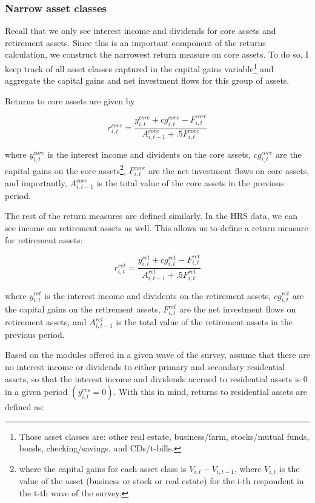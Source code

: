  \subsubsection{Narrow asset classes}
 
\par Recall that we only see interest income and dividends for core assets and retirement assets. Since this is an important component of the returns calculation, we construct the narrowest return measure on core assets. To do so, I keep track of all asset classes captured in the capital gains variable\footnote{Those asset classes are: other real estate, business/farm, stocks/mutual funds, bonds, checking/savings, and CDs/t-bills.} and aggregate the capital gains and net investment flows for this group of assets.

\par Returns to core assets are given by

$$ r^{core}_{i,t} = \frac{y^{core}_{i,t} + cg^{core}_{i,t} - F^{core}_{i,t}}{A^{core}_{i,t-1} + .5F^{core}_{i,t}}   $$

where $y^{core}_{i,t}$ is the interest income and dividents on the core assets, $cg^{core}_{i,t}$ are the capital gains on the core assets\footnote{where the capital gains for each asset class is $V_{i,t} - V_{i,t-1}$, where $V_{i,t}$ is the value of the asset (business or stock or real estate) for the i-th respondent in the t-th wave of the survey.}, $F^{core}_{i,t}$ are the net investment flows on core assets, and importantly, $A^{core}_{i,t-1}$ is the total value of the core assets in the previous period.

\par The rest of the return measures are defined similarly. In the HRS data, we can see income on retirement assets as well. This allows us to define a return measure for retirement assets:

$$ r^{ret}_{i,t} = \frac{y^{ret}_{i,t} + cg^{ret}_{i,t} - F^{ret}_{i,t}}{A^{ret}_{i,t-1} + .5F^{ret}_{i,t}}   $$

where $y^{ret}_{i,t}$ is the interest income and dividents on the retirement assets, $cg^{ret}_{i,t}$ are the capital gains on the retirement assets, $F^{ret}_{i,t}$ are the net investment flows on retirement assets, and $A^{ret}_{i,t-1}$ is the total value of the retirement assets in the previous period.

\par Based on the modules offered in a given wave of the survey, assume that there are no interest income or dividends to either primary and secondary residential assets, so that the interest income and dividends accrued to residential assets is 0 in a given period $(y^{res}_{i,t}=0)$. With this in mind, returns to residential assets are defined as:

